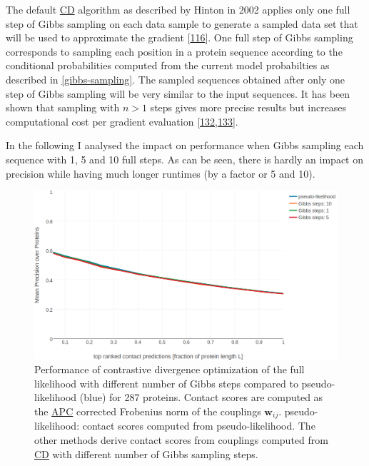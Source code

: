 \documentclass[12pt,a4paper,twoside]{book}
\newcommand{\wij}{\mathbf{w}_{ij}}
\theoremstyle{definition}
\theoremstyle{definition}
\theoremstyle{remark}
\begin{document}
The default \protect\hyperlink{abbrev}{CD} algorithm as described by
Hinton in 2002 applies only one full step of Gibbs sampling on each data
sample to generate a sampled data set that will be used to approximate
the gradient {[}\protect\hyperlink{ref-Hinton2002}{116}{]}. One full
step of Gibbs sampling corresponds to sampling each position in a
protein sequence according to the conditional probabilities computed
from the current model probabilties as described in
\ref{gibbs-sampling}. The sampled sequences obtained after only one step
of Gibbs sampling will be very similar to the input sequences. It has
been shown that sampling with \(n>1\) steps gives more precise results
but increases computational cost per gradient evaluation
{[}\protect\hyperlink{ref-Bengio2009}{132},\protect\hyperlink{ref-Tieleman2008}{133}{]}.

In the following I analysed the impact on performance when Gibbs
sampling each sequence with 1, 5 and 10 full steps. As can be seen,
there is hardly an impact on precision while having much longer runtimes
(by a factor or 5 and 10).











\begin{figure}

{\centering \includegraphics[width=0.9\linewidth]{img/full_likelihood/precision_vs_rank_notitle_cd_comparing_nr_of_gibbs_sampling_steps} 

}

\caption{Performance of contrastive
divergence optimization of the full likelihood with different number of
Gibbs steps compared to pseudo-likelihood (blue) for 287 proteins.
Contact scores are computed as the \protect\hyperlink{abbrev}{APC}
corrected Frobenius norm of the couplings \(\wij\). pseudo-likelihood:
contact scores computed from pseudo-likelihood. The other methods derive
contact scores from couplings computed from
\protect\hyperlink{abbrev}{CD} with different number of Gibbs sampling
steps.}\label{fig:precision-cd-gibbs-steps}
\end{figure}
\end{document}
